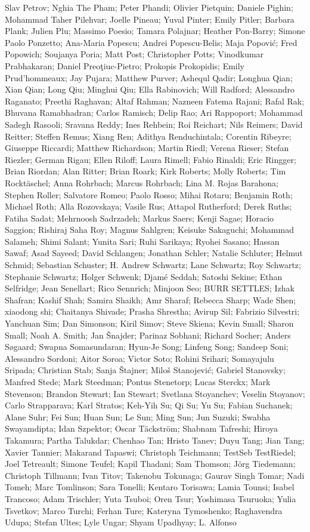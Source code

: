 \documentclass[11pt]{article}
\begin{document}
Slav Petrov; Nghia The Pham; Peter Phandi; Olivier Pietquin; Daniele Pighin; Mohammad Taher Pilehvar; Joelle Pineau; Yuval Pinter; Emily Pitler; Barbara Plank; Julien Plu; Massimo Poesio; Tamara Polajnar; Heather Pon-Barry; Simone Paolo Ponzetto; Ana-Maria Popescu; Andrei Popescu-Belis; Maja Popović; Fred Popowich; Soujanya Poria; Matt Post; Christopher Potts; Vinodkumar Prabhakaran; Daniel Preoţiuc-Pietro; Prokopis Prokopidis; Emily Prud'hommeaux; Jay Pujara; Matthew Purver; Ashequl Qadir; Longhua Qian; Xian Qian; Long Qiu; Minghui Qiu; Ella Rabinovich; Will Radford; Alessandro Raganato; Preethi Raghavan; Altaf Rahman; Nazneen Fatema Rajani; Rafal Rak; Bhuvana Ramabhadran; Carlos Ramisch; Delip Rao; Ari Rappoport; Mohammad Sadegh Rasooli; Sravana Reddy; Ines Rehbein; Roi Reichart; Nils Reimers; David Reitter; Steffen Remus; Xiang Ren; Adithya Renduchintala; Corentin Ribeyre; Giuseppe Riccardi; Matthew Richardson; Martin Riedl; Verena Rieser; Stefan Riezler; German Rigau; Ellen Riloff; Laura Rimell; Fabio Rinaldi; Eric Ringger; Brian Riordan; Alan Ritter; Brian Roark; Kirk Roberts; Molly Roberts; Tim Rocktäschel; Anna Rohrbach; Marcus Rohrbach; Lina M. Rojas Barahona; Stephen Roller; Salvatore Romeo; Paolo Rosso; Mihai Rotaru; Benjamin Roth; Michael Roth; Alla Rozovskaya; Vasile Rus; Attapol Rutherford; Derek Ruths; Fatiha Sadat; Mehrnoosh Sadrzadeh; Markus Saers; Kenji Sagae; Horacio Saggion; Rishiraj Saha Roy; Magnus Sahlgren; Keisuke Sakaguchi; Mohammad Salameh; Shimi Salant; Yunita Sari; Ruhi Sarikaya; Ryohei Sasano; Hassan Sawaf; Asad Sayeed; David Schlangen; Jonathan Schler; Natalie Schluter; Helmut Schmid; Sebastian Schuster; H. Andrew Schwartz; Lane Schwartz; Roy Schwartz; Stephanie Schwartz; Holger Schwenk; Djamé Seddah; Satoshi Sekine; Ethan Selfridge; Jean Senellart; Rico Sennrich; Minjoon Seo; BURR SETTLES; Izhak Shafran; Kashif Shah; Samira Shaikh; Amr Sharaf; Rebecca Sharp; Wade Shen; xiaodong shi; Chaitanya Shivade; Prasha Shrestha; Avirup Sil; Fabrizio Silvestri; Yanchuan Sim; Dan Simonson; Kiril Simov; Steve Skiena; Kevin Small; Sharon Small; Noah A. Smith; Jan Šnajder; Parinaz Sobhani; Richard Socher; Anders Søgaard; Swapna Somasundaran; Hyun-Je Song; Linfeng Song; Sandeep Soni; Alessandro Sordoni; Aitor Soroa; Victor Soto; Rohini Srihari; Somayajulu Sripada; Christian Stab; Sanja Štajner; Miloš Stanojević; Gabriel Stanovsky; Manfred Stede; Mark Steedman; Pontus Stenetorp; Lucas Sterckx; Mark Stevenson; Brandon Stewart; Ian Stewart; Svetlana Stoyanchev; Veselin Stoyanov; Carlo Strapparava; Karl Stratos; Keh-Yih Su; Qi Su; Yu Su; Fabian Suchanek; Alane Suhr; Fei Sun; Huan Sun; Le Sun; Ming Sun; Jun Suzuki; Swabha Swayamdipta; Idan Szpektor; Oscar Täckström; Shabnam Tafreshi; Hiroya Takamura; Partha Talukdar; Chenhao Tan; Hristo Tanev; Duyu Tang; Jian Tang; Xavier Tannier; Makarand Tapaswi; Christoph Teichmann; TestSeb TestRiedel; Joel Tetreault; Simone Teufel; Kapil Thadani; Sam Thomson; Jörg Tiedemann; Christoph Tillmann; Ivan Titov; Takenobu Tokunaga; Gaurav Singh Tomar; Nadi Tomeh; Marc Tomlinson; Sara Tonelli; Kentaro Torisawa; Lamia Tounsi; Isabel Trancoso; Adam Trischler; Yuta Tsuboi; Oren Tsur; Yoshimasa Tsuruoka; Yulia Tsvetkov; Marco Turchi; Ferhan Ture; Kateryna Tymoshenko; Raghavendra Udupa; Stefan Ultes; Lyle Ungar; Shyam Upadhyay; L. Alfonso 
\end{document}
